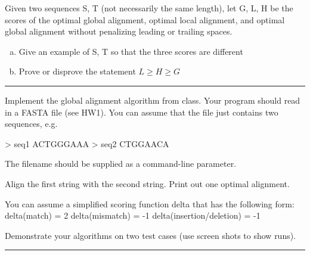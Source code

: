 \documentclass[11pt]{article}
\begin{document}
Given two sequences S, T (not necessarily the same length), let G, L, H be the scores of the
optimal global alignment, optimal local alignment, and optimal global alignment without penalizing leading or trailing spaces.


\begin{enumerate}[a)]
    \item Give an example of S, T so that the three scores are different
    \item Prove or disprove the statement $L \geq H \geq G$
\end{enumerate}

\hrule



Implement the global alignment algorithm from class.  Your program should read in a FASTA file (see HW1).  You can assume that the file just contains two sequences, e.g.

> seq1
ACTGGGAAA
> seq2
CTGGAACA

The filename should be supplied as a command-line parameter.

Align the first string with the second string.  Print out one optimal alignment.

You can assume a simplified scoring function delta that has the following form:
delta(match) = 2
delta(mismatch) = -1
delta(insertion/deletion) = -1

Demonstrate your algorithms on two test cases (use screen shots to show runs). 

\hrule



\lstset{style=mystyle}

\end{document}
